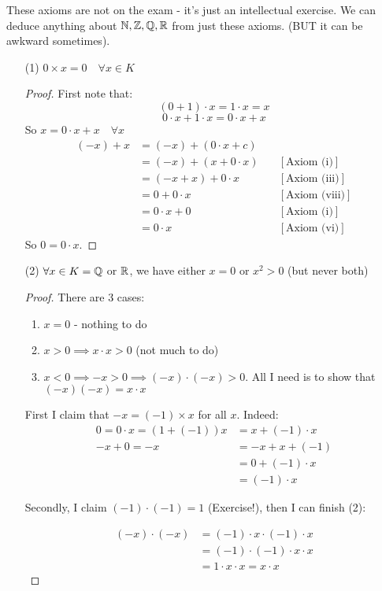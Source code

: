 \documentclass[twoside]{scrartcl}
\begin{document}
These axioms are not on the exam - it's just an intellectual exercise. We can deduce anything about $\mathbb{N}, \mathbb{Z}, \mathbb{Q}, \mathbb{R}$ from just these axioms. (BUT it can be awkward sometimes). \\

\begin{examples}
\begin{itemize}
\item[(1)] $0 \times x = 0\quad \forall x \in K$
\begin{proof} First note that:
\[(0 + 1) \cdot x = 1\cdot x = x\]
\[0 \cdot x + 1\cdot x = 0 \cdot x + x\]
So $x = 0 \cdot x + x \quad \forall x$
\[
\begin{aligned}
  (-x) + x &= (-x) + (0\cdot x + c)\\
  &= (-x) + (x + 0\cdot x) \quad  &[\text{Axiom (i)}]\\
  &= (-x + x) + 0\cdot x \quad &[\text{Axiom (iii)}]\\
  &= 0 + 0\cdot x \quad &[\text{Axiom (viii)}]\\
  &= 0\cdot x + 0 \quad &[\text{Axiom (i)}]\\
  &= 0\cdot x \quad &[\text{Axiom (vi)}]
\end{aligned}
\]
So $0 = 0\cdot x$. 
\end{proof}\vspace*{5pt}

\item[(2)] $\forall x \in K = \mathbb{Q}$ or $\mathbb{R}$, we have either $x = 0$ or $x^2 > 0$ (but never both)
\begin{proof}
There are 3 cases: 
\begin{enumerate}
\item $x = 0$ - nothing to do
\item $x >  0 \implies x\cdot x > 0$ (not much to do)
\item $x < 0 \implies -x > 0 \implies (-x) \cdot (-x) > 0$. All I need is to show that $(-x)(-x) =x\cdot x$	
\end{enumerate}\vspace*{5pt}

First I claim that $-x = (-1)\times x$ for all $x$. Indeed: 
\[
\begin{aligned}
  0 = 0\cdot x = (1 + (-1))x &= x + (-1)\cdot x\\
  -x + 0 = -x &= -x + x + (-1)\\
  &= 0 + (-1)\cdot x\\
  &= (-1)\cdot x
\end{aligned}
\]

Secondly, I claim $(-1)\cdot(-1) = 1$ (Exercise!), then I can finish (2):

\[
\begin{aligned}
  (-x)\cdot(-x) &= (-1)\cdot x \cdot (-1)\cdot x\\
  &= (-1)\cdot (-1)\cdot x\cdot x\\
  &= 1\cdot x\cdot x = x \cdot x
\end{aligned}
\]	
\end{proof}	
\end{itemize}
\end{examples}\vspace*{10pt}
\end{document}
